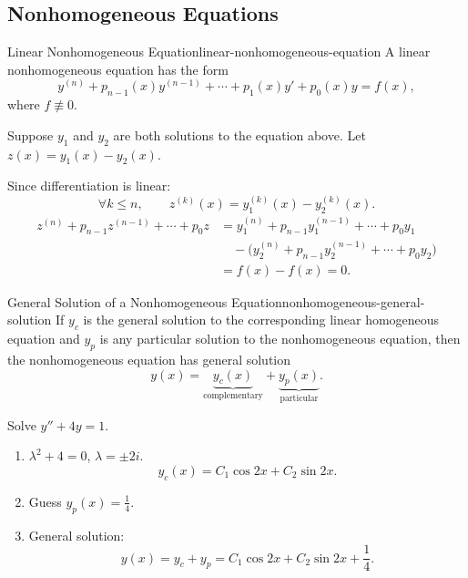\newpage
\subsection{Nonhomogeneous Equations}

\begin{definition}{Linear Nonhomogeneous Equation}{linear-nonhomogeneous-equation}
  A linear nonhomogeneous equation has the form
  \[
    y^{(n)}+p_{n-1}(x)y^{(n-1)}+\cdots+p_1(x)y'+p_0(x)y=f(x),
  \]
  where $f\not\equiv0$.
\end{definition}

Suppose $y_1$ and $y_2$ are both solutions to the equation above.
Let $z(x)=y_1(x)-y_2(x)$.

Since differentiation is linear:
\[
  \forall k\le n,\qquad z^{(k)}(x)=y_1^{(k)}(x)-y_2^{(k)}(x).
\]
\begin{align*}
  z^{(n)}+p_{n-1}z^{(n-1)}+\cdots+p_0z
   & =y_1^{(n)}+p_{n-1}y_1^{(n-1)}+\cdots+p_0y_1                  \\
   & \quad-\bigl(y_2^{(n)}+p_{n-1}y_2^{(n-1)}+\cdots+p_0y_2\bigr) \\
   & =f(x)-f(x)=0.
\end{align*}

\begin{theorem}{General Solution of a Nonhomogeneous Equation}{nonhomogeneous-general-solution}
  If $y_c$ is the general solution to the corresponding linear homogeneous
  equation and $y_p$ is any particular solution to the nonhomogeneous equation,
  then the nonhomogeneous equation has general solution
  \[
    y(x)=\underbrace{y_c(x)}_{\text{complementary}}
    +\underbrace{y_p(x)}_{\text{particular}}.
  \]
\end{theorem}

\begin{example}
  Solve $y''+4y=1$.
  \begin{enumerate}
    \item $\lambda^2+4=0$, $\lambda=\pm2i$.
          \[
            y_c(x)=C_1\cos2x+C_2\sin2x.
          \]
    \item Guess $y_p(x)=\frac14$.
    \item General solution:
          \[
            y(x)=y_c+y_p=C_1\cos2x+C_2\sin2x+\frac14.
          \]
  \end{enumerate}
\end{example}

